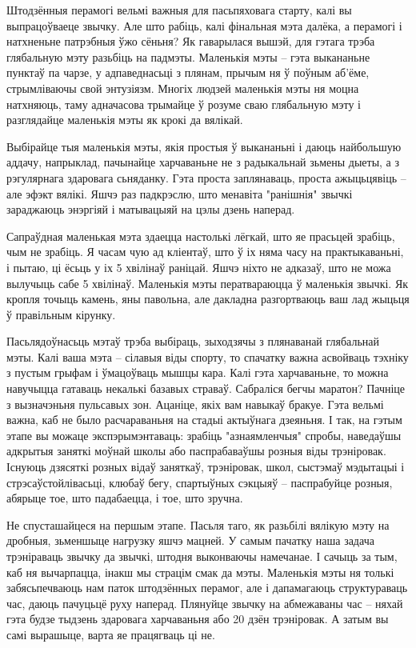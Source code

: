 Штодзённыя перамогі вельмі важныя для пасьпяховага старту, калі вы выпрацоўваеце звычку. Але што рабіць, калі фінальная мэта далёка, а перамогі і натхненьне патрэбныя ўжо сёньня? Як гаварылася вышэй, для гэтага трэба глябальную мэту разьбіць на падмэты. Маленькія мэты – гэта выкананьне пунктаў па чарзе, у адпаведнасьці з плянам, прычым ня ў поўным аб'ёме, стрымліваючы свой энтузіязм. Многіх людзей маленькія мэты ня моцна натхняюць, таму адначасова трымайце ў розуме сваю глябальную мэту і разглядайце маленькія мэты як крокі да вялікай.

Выбірайце тыя маленькія мэты, якія простыя ў выкананьні і даюць найбольшую аддачу, напрыклад, пачынайце харчаваньне не з радыкальнай зьмены дыеты, а з рэгулярнага здаровага сьняданку. Гэта проста заплянаваць, проста ажыцьцявіць – але эфэкт вялікі. Яшчэ раз падкрэслю, што менавіта "ранішнія" звычкі зараджаюць энэргіяй і матывацыяй на цэлы дзень наперад.

Сапраўдная маленькая мэта здаецца настолькі лёгкай, што яе прасьцей зрабіць, чым не зрабіць. Я часам чую ад кліентаў, што ў іх няма часу на практыкаваньні, і пытаю, ці ёсьць у іх 5 хвілінаў раніцай. Яшчэ ніхто не адказаў, што не можа вылучыць сабе 5 хвілінаў. Маленькія мэты ператвараюцца ў маленькія звычкі. Як кропля точыць камень, яны павольна, але дакладна разгортваюць ваш лад жыцьця ў правільным кірунку.

Пасьлядоўнасьць мэтаў трэба выбіраць, зыходзячы з плянаванай глябальнай мэты. Калі ваша мэта – сілавыя віды спорту, то спачатку важна асвойваць тэхніку з пустым грыфам і ўмацоўваць мышцы кара. Калі гэта харчаваньне, то можна навучыцца гатаваць некалькі базавых страваў. Сабраліся бегчы маратон? Пачніце з вызначэньня пульсавых зон. Ацаніце, якіх вам навыкаў бракуе. Гэта вельмі важна, каб не было расчараваньня на стадыі актыўнага дзеяньня. І так, на гэтым этапе вы можаце экспэрымэнтаваць: зрабіць "азнаямленчыя" спробы, наведаўшы адкрытыя заняткі моўнай школы або паспрабаваўшы розныя віды трэніровак. Існуюць дзясяткі розных відаў заняткаў, трэніровак, школ, сыстэмаў мэдытацыі і стрэсаўстойлівасьці, клюбаў бегу, спартыўных сэкцыяў – паспрабуйце розныя, абярыце тое, што падабаецца, і тое, што зручна.

Не спусташайцеся на першым этапе. Пасьля таго, як разьбілі вялікую мэту на дробныя, зьменшыце нагрузку яшчэ мацней. У самым пачатку наша задача трэніраваць звычку да звычкі, штодня выконваючы намечанае. І сачыць за тым, каб ня вычарпацца, інакш мы страцім смак да мэты. Маленькія мэты ня толькі забясьпечваюць нам паток штодзённых перамог, але і дапамагаюць структураваць час, даюць пачуцьцё руху наперад. Плянуйце звычку на абмежаваны час – няхай гэта будзе тыдзень здаровага харчаваньня або 20 дзён трэніровак. А затым вы самі вырашыце, варта яе працягваць ці не.

